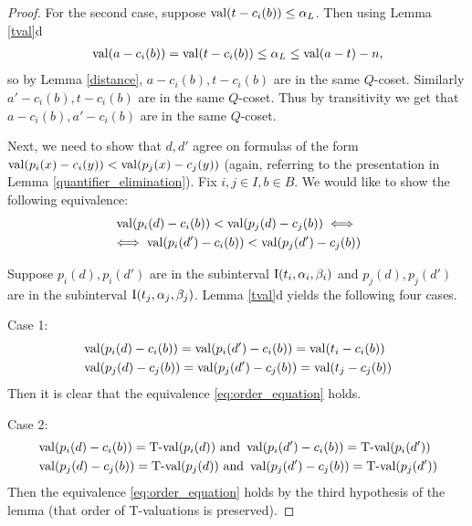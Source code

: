 \documentclass{amsart}
\begin{document}
\begin{proof}
  For the second case, suppose $\operatorname{val}(t - c_i(b)) \leq \alpha_L$.
  Then using Lemma \ref{tval}d
  \begin{align*}
    \operatorname{val}(a - c_i(b)) = \operatorname{val}(t - c_i(b)) \leq \alpha_L \leq \operatorname{val}(a - t) - n,
  \end{align*}
  so by Lemma \ref{distance}, $a - c_i(b), t - c_i(b)$ are in the same $Q$-coset.
  Similarly $a' - c_i(b), t - c_i(b)$ are in the same $Q$-coset.
  Thus by transitivity we get that $a - c_i(b), a' - c_i(b)$ are in the same $Q$-coset.

  Next, we need to show that $d, d'$ agree on formulas of the form
  $\operatorname{val} (p_i(x) - c_i(y)) < \operatorname{val} (p_j(x) - c_j(y))$ 
  (again, referring to the presentation in Lemma \ref{quantifier_elimination}).
  Fix $i,j \in I, b \in B$.
  We would like to show the following equivalence: 
  \begin{multline} \label {eq:order_equation}
    \operatorname{val} (p_i(d) - c_i(b)) < \operatorname{val} (p_j(d) - c_j(b)) \iff \\
    \iff \operatorname{val} (p_i(d') - c_i(b)) < \operatorname{val} (p_j(d') - c_j(b))
  \end{multline}

  Suppose $p_i(d), p_i(d')$ are in the subinterval $\operatorname{I}(t_i, \alpha_i, \beta_i)$ and 
  $p_j(d), p_j(d')$ are in the subinterval $\operatorname{I}(t_j, \alpha_j, \beta_j)$.
  Lemma \ref{tval}d yields the following four cases.

  Case 1:
  \begin{align*}
    &\operatorname{val} (p_i(d) - c_i(b)) = \operatorname{val} (p_i(d') - c_i(b)) = \operatorname{val}(t_i - c_i(b)) \\
    &\operatorname{val} (p_j(d) - c_j(b)) = \operatorname{val} (p_j(d') - c_j(b)) = \operatorname{val}(t_j - c_j(b))
  \end{align*}
  Then it is clear that the equivalence \eqref{eq:order_equation} holds.

  Case 2:
  \begin{align*}
    &\operatorname{val} (p_i(d) - c_i(b)) = \operatorname{T-val}(p_i(d)) \text{ and } \operatorname{val} (p_i(d') - c_i(b)) = \operatorname{T-val}(p_i(d')) \\
    &\operatorname{val} (p_j(d) - c_j(b)) = \operatorname{T-val}(p_j(d)) \text{ and } \operatorname{val} (p_j(d') - c_j(b)) = \operatorname{T-val}(p_j(d'))
  \end{align*}
  Then the equivalence \eqref{eq:order_equation} holds by the third hypothesis of the lemma (that order of T-valuations is preserved).


\end{proof}
\end{document}
